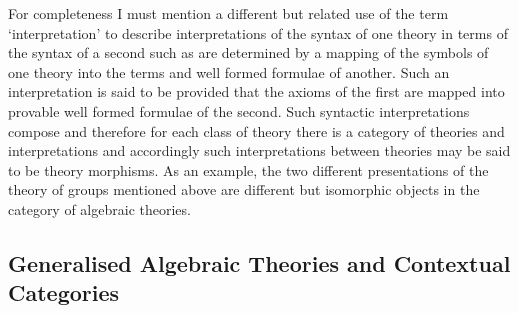 For completeness I must mention a different but related use of the term `interpretation' to describe interpretations of the syntax of one theory in terms of the syntax of a second
such as are determined by a mapping of the symbols of one theory into the terms and well formed formulae of another. 
Such an interpretation is said to be  provided that the axioms of the first are mapped into provable well formed formulae of the second.  Such syntactic interpretations compose and therefore for each class of theory there is a category of theories and interpretations and accordingly such 
interpretations between theories may be said to be theory morphisms.
As an example, the two different presentations of the theory of groups mentioned above are different but isomorphic objects in the category of algebraic theories. 

\subsection{Generalised Algebraic Theories 	and Contextual Categories}

